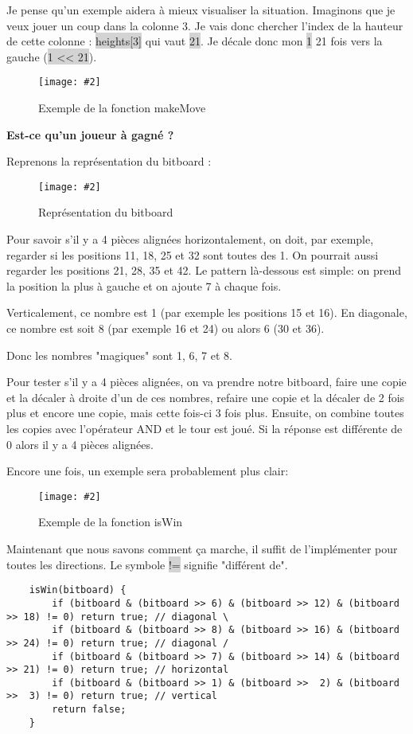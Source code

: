 \documentclass[a4paper]{article}
\newcommand{\img}[3][]{
    \begin{figure}[H]
        \centering
        \texttt{[image: \#2]}
        \caption{#1}    
    \end{figure}
}
\newcommand{\inlinecode}[1]{\colorbox{lightgray}{#1}}
\newcommand{\ptitle}[1]{\vspace{10pt}
{\large \noindent \textbf{#1}}}
\begin{document}
    Je pense qu'un exemple aidera à mieux visualiser la situation. Imaginons que je veux jouer un coup dans la colonne 3. Je vais donc chercher l'index de la hauteur de cette colonne : \inlinecode{heights[3]} qui vaut \inlinecode{21}. Je décale donc mon \inlinecode{1} 21 fois vers la gauche (\inlinecode{1 << 21}).

    \img[Exemple de la fonction makeMove]{Images/ExempleMakeMove.png}{1}

    \newpage
    \ptitle{Est-ce qu'un joueur à gagné ?}

    Reprenons la représentation du bitboard :
    \img[Représentation du bitboard]{Images/BitBoard.png}{0.5}
    Pour savoir s'il y a 4 pièces alignées horizontalement, on doit, par exemple, regarder si les positions 11, 18, 25 et 32 sont toutes des 1. On pourrait aussi regarder les positions 21, 28, 35 et 42. Le pattern là-dessous est simple: on prend la position la plus à gauche et on ajoute 7 à chaque fois.

    Verticalement, ce nombre est 1 (par exemple les positions 15 et 16). En diagonale, ce nombre est soit 8 (par exemple 16 et 24) ou alors 6 (30 et 36).

    Donc les nombres "magiques" sont 1, 6, 7 et 8.

    Pour tester s'il y a 4 pièces alignées, on va prendre notre bitboard, faire une copie et la décaler à droite d'un de ces nombres, refaire une copie et la décaler de 2 fois plus et encore une copie, mais cette fois-ci 3 fois plus. Ensuite, on combine toutes les copies avec l'opérateur AND et le tour est joué. Si la réponse est différente de 0 alors il y a 4 pièces alignées.

    Encore une fois, un exemple sera probablement plus clair:
    \img[Exemple de la fonction isWin]{Images/ExempleIsWin.png}{0.8}

    Maintenant que nous savons comment ça marche, il suffit de l'implémenter pour toutes les directions. Le symbole \inlinecode{!=} signifie "différent de".
    \begin{lstlisting}
    isWin(bitboard) {
        if (bitboard & (bitboard >> 6) & (bitboard >> 12) & (bitboard >> 18) != 0) return true; // diagonal \
        if (bitboard & (bitboard >> 8) & (bitboard >> 16) & (bitboard >> 24) != 0) return true; // diagonal /
        if (bitboard & (bitboard >> 7) & (bitboard >> 14) & (bitboard >> 21) != 0) return true; // horizontal
        if (bitboard & (bitboard >> 1) & (bitboard >>  2) & (bitboard >>  3) != 0) return true; // vertical
        return false;
    }
    \end{lstlisting}
\end{document}

